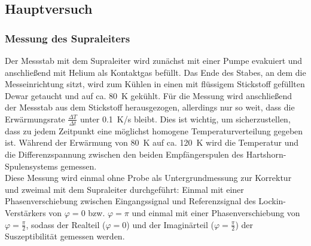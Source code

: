\documentclass[12pt,a4paper]{article}
\begin{document}
\subsection{Hauptversuch}

\subsubsection{Messung des Supraleiters}
Der Messstab mit dem Supraleiter wird zunächst mit einer Pumpe evakuiert und anschließend mit Helium als Kontaktgas befüllt. Das Ende des Stabes, an dem die Messeinrichtung sitzt, wird zum Kühlen in einen mit flüssigem Stickstoff gefüllten Dewar getaucht und auf ca. \SI{80}{K} gekühlt. Für die Messung wird anschließend der Messstab aus dem Stickstoff herausgezogen, allerdings nur so weit, dass die Erwärmungsrate $\frac{\Delta T}{\Delta t}$ unter \SI{0,1}{K/s} bleibt. Dies ist wichtig, um sicherzustellen, dass zu jedem Zeitpunkt eine möglichst homogene Temperaturverteilung gegeben ist. Während der Erwärmung von \SI{80}{K} auf ca. \SI{120}{K} wird die Temperatur und die Differenzspannung zwischen den beiden Empfängerspulen des Hartshorn-Spulensystems gemessen. \\
Diese Messung wird einmal ohne Probe als Untergrundmessung zur Korrektur und zweimal mit dem Supraleiter durchgeführt: Einmal mit einer Phasenverschiebung zwischen Eingangssignal und Referenzsignal des Lockin-Verstärkers von $\varphi = 0$ bzw. $\varphi = \pi$ und einmal mit einer Phasenverschiebung von $\varphi = \frac{\pi}{2}$, sodass der Realteil ($\varphi = 0$) und der Imaginärteil ($\varphi = \frac{\pi}{2}$) der Suszeptibilität gemessen werden.
\end{document}
